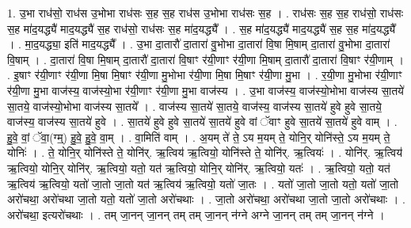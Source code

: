 \documentclass[17pt]{extarticle}
\begin{document}
1. उ॒भा राध॑सो॒ राध॑स उ॒भोभा राध॑सः स॒ह स॒ह राध॑स उ॒भोभा राध॑सः स॒ह । . राध॑सः स॒ह स॒ह राध॑सो॒ राध॑सः स॒ह मा॑द॒यद्ध्यै॑ माद॒यद्ध्यै॑ स॒ह राध॑सो॒ राध॑सः स॒ह मा॑द॒यद्ध्यै᳚ । . स॒ह मा॑द॒यद्ध्यै॑ माद॒यद्ध्यै॑ स॒ह स॒ह मा॑द॒यद्ध्यै᳚ । . मा॒द॒यद्ध्या॒ इति॑ माद॒यद्ध्यै᳚ । . उ॒भा दा॒तारौ॑ दा॒तारा॑ वु॒भोभा दा॒तारा॑ वि॒षा मि॒षाम् दा॒तारा॑ वु॒भोभा दा॒तारा॑ वि॒षाम् । . दा॒तारा॑ वि॒षा मि॒षाम् दा॒तारौ॑ दा॒तारा॑ वि॒षाꣳ र॑यी॒णाꣳ र॑यी॒णा मि॒षाम् दा॒तारौ॑ दा॒तारा॑ वि॒षाꣳ र॑यी॒णाम् । . इ॒षाꣳ र॑यी॒णाꣳ र॑यी॒णा मि॒षा मि॒षाꣳ र॑यी॒णा मु॒भोभा र॑यी॒णा मि॒षा मि॒षाꣳ र॑यी॒णा मु॒भा । . र॒यी॒णा मु॒भोभा र॑यी॒णाꣳ र॑यी॒णा मु॒भा वाज॑स्य॒ वाज॑स्यो॒भा र॑यी॒णाꣳ र॑यी॒णा मु॒भा वाज॑स्य । . उ॒भा वाज॑स्य॒ वाज॑स्यो॒भोभा वाज॑स्य सा॒तये॑ सा॒तये॒ वाज॑स्यो॒भोभा वाज॑स्य सा॒तये᳚ । . वाज॑स्य सा॒तये॑ सा॒तये॒ वाज॑स्य॒ वाज॑स्य सा॒तये॑ हुवे हुवे सा॒तये॒ वाज॑स्य॒ वाज॑स्य सा॒तये॑ हुवे । . सा॒तये॑ हुवे हुवे सा॒तये॑ सा॒तये॑ हुवे वां ॅवाꣳ हुवे सा॒तये॑ सा॒तये॑ हुवे वाम् । . हु॒वे॒ वां॒ ॅवा॒(ग्म्॒) हु॒वे॒ हु॒वे॒ वा॒म् । . वा॒मिति॑ वाम् । . अ॒यम् ते॑ ते॒ ऽय म॒यम् ते॒ योनि॒र् योनि॑स्ते॒ ऽय म॒यम् ते॒ योनिः॑ । . ते॒ योनि॒र् योनि॑स्ते ते॒ योनि॑र्. ऋ॒त्विय॑ ऋ॒त्वियो॒ योनि॑स्ते ते॒ योनि॑र्. ऋ॒त्वियः॑ । . योनि॑र्. ऋ॒त्विय॑ ऋ॒त्वियो॒ योनि॒र् योनि॑र्. ऋ॒त्वियो॒ यतो॒ यत॑ ऋ॒त्वियो॒ योनि॒र् योनि॑र्. ऋ॒त्वियो॒ यतः॑ । . ऋ॒त्वियो॒ यतो॒ यत॑ ऋ॒त्विय॑ ऋ॒त्वियो॒ यतो॑ जा॒तो जा॒तो यत॑ ऋ॒त्विय॑ ऋ॒त्वियो॒ यतो॑ जा॒तः । . यतो॑ जा॒तो जा॒तो यतो॒ यतो॑ जा॒तो अरो॑चथा॒ अरो॑चथा जा॒तो यतो॒ यतो॑ जा॒तो अरो॑चथाः । . जा॒तो अरो॑चथा॒ अरो॑चथा जा॒तो जा॒तो अरो॑चथाः । . अरो॑चथा॒ इत्यरो॑चथाः । . तम् जा॒नन् जा॒नन् तम् तम् जा॒नन् न॑ग्ने अग्ने जा॒नन् तम् तम् जा॒नन् न॑ग्ने । \newline
\end{document}
